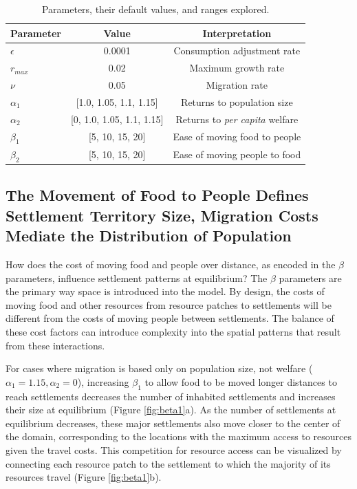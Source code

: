 \documentclass{article}
\begin{document}
\begin{table}[h] %
\begin{center}
    
\caption{Parameters, their default values, and ranges explored.}
\label{table1}
\begin{tabu}{l c c} \\ \hline
    Parameter & Value & Interpretation \\ \hline
    $\epsilon$ & 0.0001 & Consumption adjustment rate \\   
    $r_{\mathit{max}}$ & 0.02 & Maximum growth rate \\
    $\nu$ & 0.05 & Migration rate \\
    $\alpha_1$ & [1.0, 1.05, 1.1, 1.15]   &  Returns to population size \\
    $\alpha_2$ & [0, 1.0, 1.05, 1.1, 1.15] & Returns to \textit{per capita} welfare \\
    $\beta_1$ & [5, 10, 15, 20] & Ease of moving food to people  \\
    $\beta_2$ & [5, 10, 15, 20]   &    Ease of moving people to food \\ \hline
\end{tabu}
\end{center}
\end{table}

\subsection{The Movement of Food to People Defines Settlement Territory Size, Migration Costs Mediate the Distribution of Population}

How does the cost of moving food and people over distance, as encoded in the $\beta$ parameters, influence settlement patterns at equilibrium? The $\beta$ parameters are the primary way space is introduced into the model. By design, the costs of moving food and other resources from resource patches to settlements will be different from the costs of moving people between settlements. The balance of these cost factors can introduce complexity into the spatial patterns that result from these interactions. 

For cases where migration is based only on population size, not welfare ($\alpha_1 = 1.15, \alpha_2 = 0$), increasing $\beta_1$ to allow food to be moved longer distances to reach settlements decreases the number of inhabited settlements and increases their size at equilibrium (Figure \ref{fig:beta1}a). As the number of settlements at equilibrium decreases, these major settlements also move closer to the center of the domain, corresponding to the locations with the maximum access to resources given the travel costs. This competition for resource access can be visualized by connecting each resource patch to the settlement to which the majority of its resources travel  (Figure \ref{fig:beta1}b). 
\end{document}
